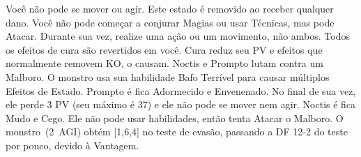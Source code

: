 %
 Você não pode se mover ou agir. Este estado é removido ao receber qualquer dano.\ofgap
%
 Você não pode começar a conjurar Magias ou usar Técnicas, mas pode Atacar.\ofgap
%
 Durante sua vez, realize uma ação ou um movimento, não ambos.\ofgap
%
 Todos os efeitos de cura são revertidos em você. Cura reduz seu PV e efeitos que normalmente removem KO, o causam.
%
\vfill
%
{
	Noctis e Prompto lutam contra um Malboro. 
	O monstro usa sua habilidade Bafo Terrível para causar múltiplos Efeitos de Estado. 
	Prompto é fica Adormecido e Envenenado. 
	No final de sua vez, ele perde 3 PV (seu máximo é 37) e ele não pode se mover nem agir. 
	Noctis é fica Mudo e Cego. 
	Ele não pode usar habilidades, então tenta Atacar o Malboro. 
	O monstro~(2~AGI) obtém [1,6,4] no teste de evasão, passando a DF 12-2 do teste por pouco, devido à Vantagem.
}
%
\clearpage
